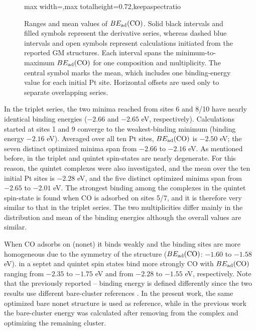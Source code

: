 \begin{figure}[htbp]
\centering
\begin{adjustbox}{max width=\linewidth,max totalheight=0.72\textheight,keepaspectratio}

\end{adjustbox}
\caption{Ranges and mean values of $BE_{\rm ad}(\ce{CO})$. Solid black
intervals and filled symbols represent the derivative
series, whereas dashed blue intervals and open symbols represent
calculations initiated from the reported GM structures. Each interval spans
the minimum-to-maximum $BE_{\rm ad}(\ce{CO})$ for one composition and
multiplicity. The central symbol marks the mean, which includes one
binding-energy value for each initial Pt site. Horizontal
offsets are used only to separate overlapping series.}
\label{fig:tfg_adsorption_distribution}
\end{figure}


In the triplet  series, the two minima reached from sites 6 and 8/10 have nearly identical binding energies ($-2.66$ and $-2.65$ eV, respectively). Calculations started at sites 1 and 9
converge to the weakest-binding minimum (binding energy $-2.16$ eV). Averaged over all ten Pt sites,
$BE_{\rm ad}(\ce{CO})$ is $-2.50$ eV; the seven distinct optimized minima
span from $-2.66$ to $-2.16$ eV. As mentioned before,   in the triplet and quintet spin-states are nearly degenerate. For this reason, the quintet  complexes were also investigated, and the
mean over the ten initial Pt sites is $-2.28$ eV, and the five distinct
optimized minima span from $-2.65$ to $-2.01$ eV.
The strongest binding among the  complexes in the quintet spin-state is found when CO is adsorbed on 
sites 5/7, and it is therefore very similar to that in the triplet series. The
two multiplicities differ mainly in the distribution and mean of the
binding energies although the overall values are similar.

When CO adsorbs on (nonet) it binds weakly and the binding sites
are more homogeneous due to the symmetry of the structure ($BE_{\rm
ad}(\ce{CO})$: $-1.60$ to $-1.58$ eV).  in a septet and quintet
spin states bind more strongly CO with $BE_{\rm ad}(\ce{CO})$ ranging from
$-2.35$ to $-1.75$ eV and from $-2.28$ to $-1.55$ eV, respectively. Note that
the previously reported -- binding energy is defined differently
since the two results use different bare-cluster references
\cite{ugartemendia:2022}. In the present work, the same optimized bare nonet
 structure is used as reference, while in the previous work the bare-cluster energy was calculated after removing  from the complex and optimizing the remaining cluster.


